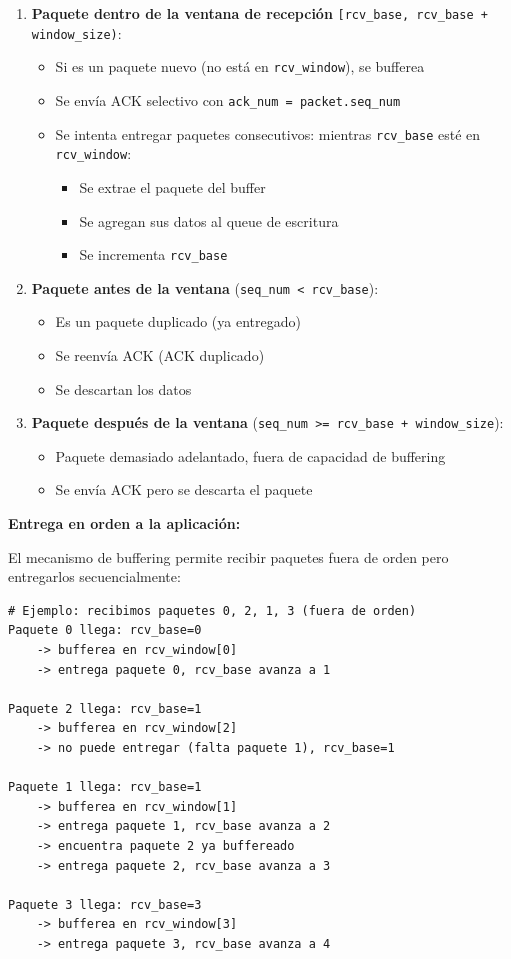 \begin{enumerate}
    \item \textbf{Paquete dentro de la ventana de recepción} \texttt{[rcv\_base, rcv\_base + window\_size)}:
    \begin{itemize}
        \item Si es un paquete nuevo (no está en \texttt{rcv\_window}), se bufferea
        \item Se envía ACK selectivo con \texttt{ack\_num = packet.seq\_num}
        \item Se intenta entregar paquetes consecutivos: mientras \texttt{rcv\_base} esté en \texttt{rcv\_window}:
        \begin{itemize}
            \item Se extrae el paquete del buffer
            \item Se agregan sus datos al queue de escritura
            \item Se incrementa \texttt{rcv\_base}
        \end{itemize}
    \end{itemize}
    
    \item \textbf{Paquete antes de la ventana} (\texttt{seq\_num < rcv\_base}):
    \begin{itemize}
        \item Es un paquete duplicado (ya entregado)
        \item Se reenvía ACK (ACK duplicado)
        \item Se descartan los datos
    \end{itemize}
    
    \item \textbf{Paquete después de la ventana} (\texttt{seq\_num >= rcv\_base + window\_size}):
    \begin{itemize}
        \item Paquete demasiado adelantado, fuera de capacidad de buffering
        \item Se envía ACK pero se descarta el paquete
    \end{itemize}
\end{enumerate}

\textbf{Entrega en orden a la aplicación:}

El mecanismo de buffering permite recibir paquetes fuera de orden pero entregarlos secuencialmente:

\begin{verbatim}
# Ejemplo: recibimos paquetes 0, 2, 1, 3 (fuera de orden)
Paquete 0 llega: rcv_base=0
    -> bufferea en rcv_window[0]
    -> entrega paquete 0, rcv_base avanza a 1
    
Paquete 2 llega: rcv_base=1
    -> bufferea en rcv_window[2]
    -> no puede entregar (falta paquete 1), rcv_base=1
    
Paquete 1 llega: rcv_base=1
    -> bufferea en rcv_window[1]
    -> entrega paquete 1, rcv_base avanza a 2
    -> encuentra paquete 2 ya buffereado
    -> entrega paquete 2, rcv_base avanza a 3
    
Paquete 3 llega: rcv_base=3
    -> bufferea en rcv_window[3]
    -> entrega paquete 3, rcv_base avanza a 4
\end{verbatim}

